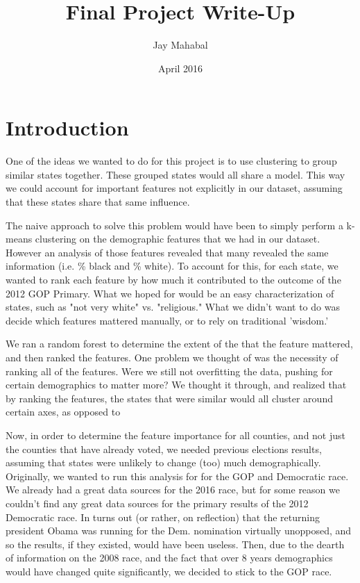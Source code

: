 \documentclass{article}
\title{Final Project Write-Up}
\author{Jay Mahabal}
\date{April 2016}
\begin{document}
\maketitle

\section{Introduction}

One of the ideas we wanted to do for this project is to use clustering to group similar states together. These grouped states would all share a model. This way we could account for important features not explicitly in our dataset, assuming that these states share that same influence. \par


The naive approach to solve this problem would have been to simply perform a k-means clustering on the demographic features that we had in our dataset. However an analysis of those features revealed that many revealed the same information (i.e. \% black and \% white). To account for this, for each state, we wanted to rank each feature by how much it contributed to the outcome of the 2012 GOP Primary. What we hoped for would be an easy characterization of states, such as "not very white" vs. "religious." What we didn't want to do was decide which features mattered manually, or to rely on traditional 'wisdom.' 


We ran a random forest to determine the extent of the that the feature mattered, and then ranked the features. One problem we thought of was the necessity of ranking all of the features. Were we still not overfitting the data, pushing for certain demographics to matter more? We thought it through, and realized that by ranking the features, the states that were similar would all cluster around certain axes, as opposed to 

Now, in order to determine the feature importance for all counties, and not just the counties that have already voted, we needed previous elections results, assuming that states were unlikely to change (too) much demographically. Originally, we wanted to run this analysis for for the GOP and Democratic race. We already had a great data sources for the 2016 race, but for some reason we couldn't find any great data sources for the primary results of the 2012 Democratic race. In turns out (or rather, on reflection) that the returning president Obama was running for the Dem. nomination virtually unopposed, and so the results, if they existed, would have been useless. Then, due to the dearth of information on the 2008 race, and the fact that over 8 years demographics would have changed quite significantly, we decided to stick to the GOP race.
\end{document}
